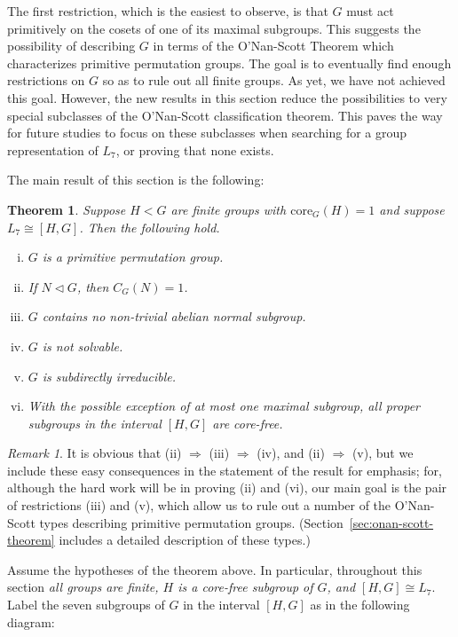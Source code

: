 \documentclass[cm,dissertation]{uhthesis}
\theoremstyle{plain}
\newtheorem{theorem}{Theorem}[section]
\theoremstyle{definition}
\theoremstyle{remark}
\newtheorem*{remark}{Remark}
\numberwithin{theorem}{section}
\numberwithin{claim}{chapter}
\numberwithin{equation}{section}
\numberwithin{conjecture}{chapter}
\newcommand{\<}{\ensuremath{\langle}}
\renewcommand{\>}{\ensuremath{\rangle}}
\newcommand{\ssubnormal}{\ensuremath{\vartriangleleft}}
\newcommand{\core}{\ensuremath{\mathrm{core}}}
\newcommand{\0}{\ensuremath{\mathbf{0}}}
\newcommand{\1}{\ensuremath{\mathbf{1}}}
\newcommand{\2}{\ensuremath{\mathbf{2}}}
\newcommand{\3}{\ensuremath{\mathbf{3}}}
\newcommand{\4}{\ensuremath{\mathbf{4}}}
\newcommand{\5}{\ensuremath{\mathbf{5}}}
\begin{document}
The first restriction, which is
the easiest to observe, is that $G$ must act primitively on the cosets of one of its
maximal subgroups.  This suggests the possibility of describing $G$ in terms of
the
%
%
O'Nan-Scott Theorem which characterizes primitive
permutation groups. The goal is to eventually find enough
restrictions on $G$ so as to rule out all finite groups.  As yet, we have not
achieved this goal.  However, the new results in this section reduce the
possibilities to very special subclasses of the O'Nan-Scott classification
theorem.  This paves the way for future studies to focus on these subclasses
when searching for a group representation of $L_7$, or proving that none exists.

The main result of this section is the following:
\begin{theorem}
\label{thm:except-seven-elem}
Suppose $H<G$ are finite groups with $\core_G(H) = 1$ and suppose
$L_7 \cong [H,G]$.  Then the following hold.
\begin{enumerate}[(i)]
\item $G$ is a primitive permutation group.
\item If $N\ssubnormal G$, then $C_G(N) = 1$.
\item $G$ contains no non-trivial abelian normal subgroup.
\item $G$ is not solvable.
\item $G$ is subdirectly irreducible.
\item With the possible exception of at most one maximal subgroup,
  all proper subgroups in the interval $[H,G]$ are core-free. 

\end{enumerate}
\end{theorem}
\begin{remark}
  It is obvious that (ii) $\Rightarrow$ (iii) $\Rightarrow$ (iv), and  (ii) $\Rightarrow$
  (v), but we include these easy consequences in the statement of the result for
  emphasis; for, although the hard work will be in proving (ii) and (vi), our
  main goal is the pair of restrictions (iii) and (v), which allow us to rule
  out a number of the O'Nan-Scott types describing primitive permutation
  groups.  (Section~\ref{sec:onan-scott-theorem} includes a detailed description
  of these types.) 
\end{remark}

Assume the hypotheses of the theorem above.  In particular, throughout this
section \emph{all groups are finite, $H$ is a core-free subgroup of $G$, and $[H,G] \cong
  L_7$}. Label the seven subgroups of $G$ in
the interval $[H,G]$ as in the following diagram:
\end{document}
